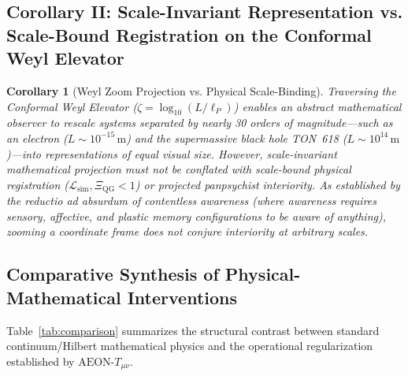 \documentclass[11pt,a4paper]{article}
\newtheorem{corollary}{Corollary}
\begin{document}
\subsection{Corollary II: Scale-Invariant Representation vs. Scale-Bound Registration on the Conformal Weyl Elevator}

\begin{corollary}[Weyl Zoom Projection vs. Physical Scale-Binding]
Traversing the Conformal Weyl Elevator ($\zeta = \log_{10}(L / \ell_P)$) \cite{Weyl1918} enables an abstract mathematical observer to rescale systems separated by nearly 30 orders of magnitude---such as an electron ($L \sim 10^{-15}\,\mathrm{m}$) and the supermassive black hole TON~618 ($L \sim 10^{14}\,\mathrm{m}$)---into representations of equal visual size. However, scale-invariant mathematical projection must not be conflated with scale-bound physical registration ($\mathcal{L}_{\mathrm{sim}}, \Xi_{\mathrm{QG}} < 1$) or projected panpsychist interiority. As established by the \emph{reductio ad absurdum} of contentless awareness (where awareness requires sensory, affective, and plastic memory configurations to be aware \emph{of} anything), zooming a coordinate frame does not conjure interiority at arbitrary scales.
\end{corollary}

\subsection{Comparative Synthesis of Physical-Mathematical Interventions}

Table~\ref{tab:comparison} summarizes the structural contrast between standard continuum/Hilbert mathematical physics and the operational regularization established by $\text{AEON-}T_{\mu\nu}$.
\end{document}
